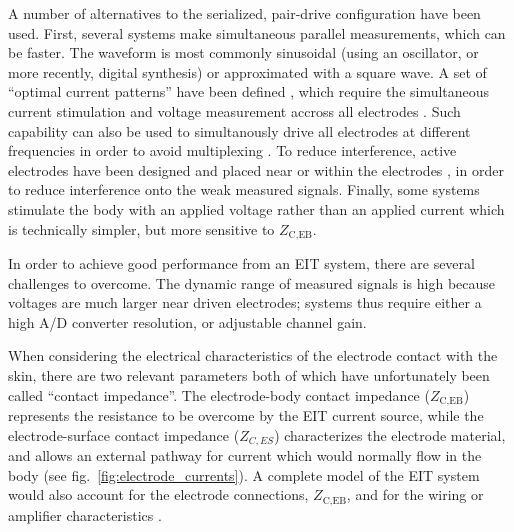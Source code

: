 \documentclass[12pt]{article} \usepackage[margin=3cm]{geometry} \usepackage[margin=20pt,font=small,labelfont=bf]{caption}\def\TBLWIDA{35mm}\def\TBLWIDB{95mm}
\newcommand\fref[1]{fig.\ \ref{#1}}
\begin{document}
A number of alternatives to the serialized, pair-drive configuration have been used.
First, several systems make
simultaneous parallel measurements, %
which can be faster. The waveform is most commonly
sinusoidal (using an oscillator, or more recently, digital synthesis)
or approximated with a square wave.
A set of ``optimal current patterns'' have been defined
\cite{Isaacson1989Optimal}, which require the simultaneous
current stimulation and voltage measurement accross
all electrodes \cite{Hua1991Optimal}. Such capability can
also be used to simultanously drive all electrodes at
different frequencies in order to avoid
multiplexing \cite{Rapin2015Cooperative}.
To reduce interference, active electrodes have been designed
and placed near or within the electrodes \cite{Li1996Active},
in order to reduce interference onto the weak measured signals.
Finally, some systems stimulate the body with an applied
voltage rather than an applied current \cite{Khan2015FPGA}
which is technically simpler, but more sensitive to $Z_\textrm{C,EB}$.

In order to achieve good performance from an EIT system, there
are several challenges to overcome. The dynamic range of
measured signals is high because voltages are much larger near
driven electrodes; systems thus require either a high
A/D converter resolution, or adjustable channel gain.

When considering the electrical characteristics of the
electrode contact with the skin, there are two relevant parameters
both of which have unfortunately been called ``contact impedance''.
The electrode-body contact impedance ($Z_\textrm{C,EB}$) represents the resistance
to be overcome by the EIT current source, while the electrode-surface
contact impedance ($Z_{C,ES}$) characterizes the electrode material, and
 allows an external pathway for current which would normally
flow in the body (see \fref{fig:electrode_currents}).
A complete model of the EIT system would also account for the 
electrode connections, $Z_\textrm{C,EB}$, and 
for the wiring or amplifier characteristics \cite{Hartinger2007Hardware}.
\end{document}
